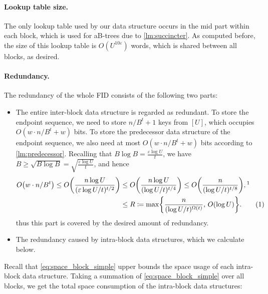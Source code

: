 \documentclass{article}
\theoremstyle{plain}
\theoremstyle{definition}  \newtheorem{definition}[theorem]{Definition}
\DeclarePairedDelimiter{\bk}{(}{)}
\DeclarePairedDelimiter{\BK}{\{}{\}}
\newcommand{\defeq}{\coloneqq}
\newcommand{\eps}{\varepsilon}
\newcommand{\numberthis}{\addtocounter{equation}{1}\tag{\theequation}}
\begin{document}
\paragraph*{Lookup table size.}
The only lookup table used by our data structure occurs in the mid part within each block, which is used for aB-trees due to \cref{lm:succincter}. As computed before, the size of this lookup table is $O(U^{10\eps})$ words, which is shared between all blocks, as desired.

\paragraph*{Redundancy.} 
The redundancy of the whole FID consists of the following two parts:
\begin{itemize}
\item The entire inter-block data structure is regarded as redundant. To store the endpoint sequence, we need to store $n/B^t + 1$ keys from $[U]$, which occupies $O(w \cdot n/B^t + w)$ bits. To store the predecessor data structure of the endpoint sequence, we also need at most $O(w\cdot n/B^t + w)$ bits according to \cref{lm:predecessor}.
  Recalling that $B \log B = \frac{\eps \log U}{t}$, we have $B \ge \sqrt{B \log B} = \sqrt{\frac{\eps \log U}{t}}$, and hence
  \begin{align*}
    O\bk*{w \cdot n/B^t} \le O\bk*{\frac{n \log U}{(\eps\log U / t)^{t/2}}}
    &\le O\bk*{\frac{n\log U}{(\log U/ t)^{t/4}}} \le O\bk*{\frac{n}{(\log U/ t)^{t/8}}},\footnotemark \\
    &\le R \defeq \max\BK*{\frac{n}{(\log U / t)^{\Omega(t)}}, \, O(\log U)}. \numberthis \label{eq:less-than-R}
  \end{align*}
  thus this part is covered by the desired amount of redundancy.
\item The redundancy caused by intra-block data structures, which we calculate below.
\end{itemize}
Recall that \eqref{eq:space_block_simple} upper bounds the space usage of each intra-block data structure. Taking a summation of \eqref{eq:space_block_simple} over all blocks, we get the total space consumption of the intra-block data structures:
\end{document}
